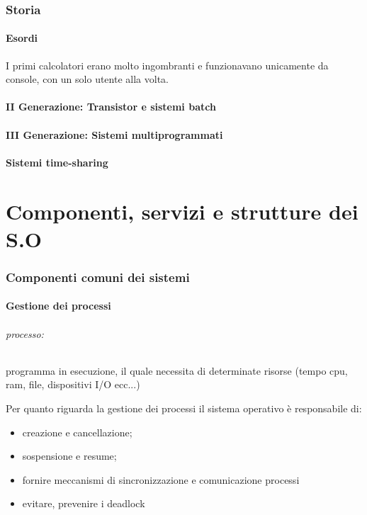 \documentclass{article}
\begin{document}
\section{Storia}
\subsection{Esordi}
I primi calcolatori erano molto ingombranti 
e funzionavano unicamente da console, con un solo utente alla volta.
\subsection{II Generazione: Transistor  e sistemi batch} 

\subsection{III Generazione: Sistemi multiprogrammati}
\subsection{Sistemi time-sharing}


\part{Componenti, servizi e strutture dei S.O}

\section{Componenti comuni dei sistemi}
\subsection{Gestione dei processi}
\paragraph{processo:} programma in esecuzione, il quale necessita di determinate risorse (tempo cpu, ram, file, dispositivi I/O ecc...)

Per quanto riguarda la gestione dei processi il sistema operativo è responsabile di:
\begin{itemize}
    \item creazione e cancellazione;
    \item sospensione e resume;
    \item fornire meccanismi di sincronizzazione e comunicazione processi
    \item evitare, prevenire i deadlock
\end{itemize}
\end{document}
